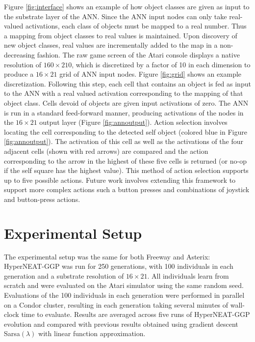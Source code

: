 \documentclass{sig-alternate}
\begin{document}
Figure \ref{fig:interface} shows an example of how object classes are given as input to the substrate layer of the ANN. Since the ANN input nodes can only take real-valued activations, each class of objects must be mapped to a real number. Thus a mapping from object classes to real values is maintained. Upon discovery of new object classes, real values are incrementally added to the map in a non-decreasing fashion. The raw game screen of the Atari console displays a native resolution of $160\times 210$, which is discretized by a factor of 10 in each dimension to produce a $16\times 21$ grid of ANN input nodes. Figure \ref{fig:grid} shows an example discretization. Following this step, each cell that contains an object is fed as input to the ANN with a real valued activation corresponding to the mapping of that object class. Cells devoid of objects are given input activations of zero. The ANN is run in a standard feed-forward manner, producing activations of the nodes in the $16\times 21$ output layer (Figure \ref{fig:annoutput}). Action selection involves locating the cell corresponding to the detected self object (colored blue in Figure \ref{fig:annoutput}). The activation of this cell as well as the activations of the four adjacent cells (shown with red arrows) are compared and the action corresponding to the arrow in the highest of these five cells is returned (or no-op if the self square has the highest value). This method of action selection supports up to five possible actions. Future work involves extending this framework to support more complex actions such a button presses and combinations of joystick and button-press actions.

\section{Experimental Setup}
\label{sec:experiments}
The experimental setup was the same for both Freeway and Asterix: HyperNEAT-GGP was run for 250 generations, with 100 individuals in each generation and a substrate resolution of $16\times 21$. All individuals learn from scratch and were evaluated on the Atari simulator using the same random seed. Evaluations of the 100 individuals in each generation were performed in parallel on a Condor cluster, resulting in each generation taking several minutes of wall-clock time to evaluate. Results are averaged across five runs of HyperNEAT-GGP evolution and compared with previous results obtained using gradient descent Sarsa$(\lambda)$ with linear function approximation\cite{naddaf10}. 
\end{document}

